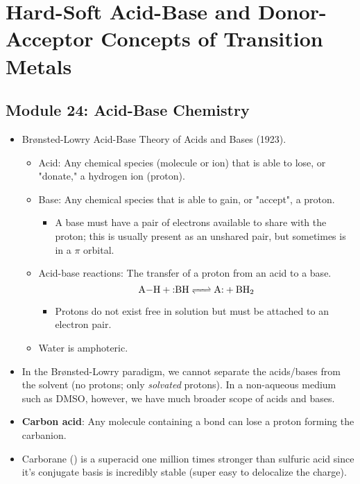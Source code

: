 \documentclass[../notes.tex]{subfiles}
\renewcommand{\chaptermark}[1]{\markboth{\chaptername\ \thechapter\ (#1)}{}}
\renewcommand{\thechapter}{\Roman{chapter}}
\begin{document}
\chapter{Hard-Soft Acid-Base and Donor-Acceptor Concepts of Transition Metals}
\chaptermark{Acids and Bases}
\section{Module 24: Acid-Base Chemistry}
\begin{itemize}
    \item {}Br{\o}nsted-Lowry Acid-Base Theory of Acids and Bases (1923).
    \begin{itemize}
        \item Acid: Any chemical species (molecule or ion) that is able to lose, or "donate," a hydrogen ion (proton).
        \item Base: Any chemical species that is able to gain, or "accept", a proton.
        \begin{itemize}
            \item A base must have a pair of electrons available to share with the proton; this is usually present as an unshared pair, but sometimes is in a $\pi$ orbital.
        \end{itemize}
        \item Acid-base reactions: The transfer of a proton from an acid to a base.
        \begin{equation*}
            \ce{A-H + $:$BH <=> A$:$ + BH2}
        \end{equation*}
        \begin{itemize}
            \item Protons do not exist free in solution but must be attached to an electron pair.
        \end{itemize}
        \item Water is amphoteric.
    \end{itemize}
    \item In the Br{\o}nsted-Lowry paradigm, we cannot separate the acids/bases from the solvent (no protons; only \emph{solvated} protons). In a non-aqueous medium such as DMSO, however, we have much broader scope of acids and bases.
    \item \textbf{Carbon acid}: Any molecule containing a  bond can lose a proton forming the carbanion.
    \item Carborane () is a superacid one million times stronger than sulfuric acid since it's conjugate basis is incredibly stable (super easy to delocalize the charge).

\end{itemize}
\end{document}
